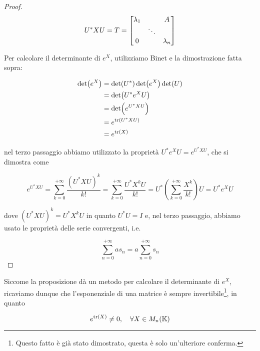 \begin{proof}
	\begin{equation}
		U^{*} X U = T = %
		\bmqty{ %
				\lambda_{1} & & A \\
				& \ddots & \\
				0 & & \lambda_{n} %
				}
	\end{equation}
	
	Per calcolare il determinante di $ e^{X} $, utilizziamo Binet e la dimostrazione fatta sopra:

	\begin{align}
		\begin{split}
			\det(e^{X}) &= \det(U^{*}) \det(e^{X}) \det(U) \\
			&= \det(U^{*} e^{X} U) \\
			&= \det(e^{U^{*} X U}) \\
			&= e^{\tr(U^{*} X U)} \\
			&= e^{\tr(X)}
		\end{split}
	\end{align}
	
	nel terzo passaggio abbiamo utilizzato la proprietà $ U^{*} e^{X} U = e^{U^{*} X U} $, che si dimostra come
	
	\begin{equation}
		e^{U^{*} X U} %
		= \sum_{k=0}^{+\infty} \dfrac{(U^{*} X U)^{k}}{k!} %
		= \sum_{k=0}^{+\infty} \dfrac{U^{*} X^{k} U}{k!} %
		= U^{*} \left( \sum_{k=0}^{+\infty} \dfrac{X^{k}}{k!} \right) U %
		= U^{*} e^{X} U
	\end{equation}

	dove $ (U^{*} X U)^{k} = U^{*} X^{k} U $ in quanto $ U^{*} U = I $ e, nel terzo passaggio, abbiamo usato le proprietà delle serie convergenti, i.e.
	
	\begin{equation}
		\sum_{n=0}^{+\infty} a s_{n} = a \sum_{n=0}^{+\infty} s_{n}
	\end{equation}
\end{proof}

\begin{corollary}\label{cor:det-exp-gl}
	Siccome la proposizione dà un metodo per calcolare il determinante di $ e^{X} $, ricaviamo dunque che l'esponenziale di una matrice è sempre invertibile\footnote{%
		Questo fatto è già stato dimostrato, questa è solo un'ulteriore conferma.%
	}, in quanto

	\begin{equation}
		e^{\tr(X)} \neq 0 \qcomma \forall X \in M_{n}(\K)
	\end{equation}
\end{corollary}

